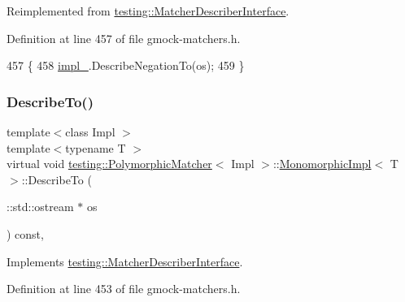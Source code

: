 Reimplemented from \hyperlink{classtesting_1_1MatcherDescriberInterface_a2071afbc47097c4d1c0064275af34db0}{testing\+::\+Matcher\+Describer\+Interface}.



Definition at line 457 of file gmock-\/matchers.\+h.


\begin{DoxyCode}
457                                                           \{
458       \hyperlink{classtesting_1_1PolymorphicMatcher_1_1MonomorphicImpl_af444d0e547c2f5b0a5e553868c042330}{impl\_}.DescribeNegationTo(os);
459     \}
\end{DoxyCode}
\mbox{\label{classtesting_1_1PolymorphicMatcher_1_1MonomorphicImpl_aa98a5eecc47f87bc297231a88714e33e}} 
\subsubsection{\texorpdfstring{Describe\+To()}{DescribeTo()}}
{\footnotesize\ttfamily template$<$class Impl $>$ \\
template$<$typename T $>$ \\
virtual void \hyperlink{classtesting_1_1PolymorphicMatcher}{testing\+::\+Polymorphic\+Matcher}$<$ Impl $>$\+::\hyperlink{classtesting_1_1PolymorphicMatcher_1_1MonomorphicImpl}{Monomorphic\+Impl}$<$ T $>$\+::Describe\+To (\begin{DoxyParamCaption}\item[{\+::std\+::ostream $\ast$}]{os }\end{DoxyParamCaption}) const\hspace{0.3cm}{\ttfamily [inline]}, {\ttfamily [virtual]}}



Implements \hyperlink{classtesting_1_1MatcherDescriberInterface_ad9f861588bd969b6e3e717f13bb94e7b}{testing\+::\+Matcher\+Describer\+Interface}.



Definition at line 453 of file gmock-\/matchers.\+h.


